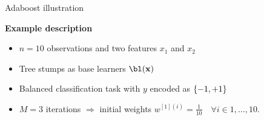 \documentclass[11pt,compress,t,notes=noshow, xcolor=table]{beamer}
\begin{document}
\begin{vbframe}{Adaboost illustration}
\begin{footnotesize}

\textbf{Example description}

\begin{itemize}
  \item $n = 10$ observations and two features $x_1$ and $x_2$ 
  \item Tree stumps as base learners $\bl(\xv)$
  \item Balanced classification task with $y$ encoded as $\{-1, +1\}$
  \item $M = 3$ iterations $\Rightarrow$ initial weights 
  $w^{[1](i)} = \frac{1}{10} \quad \forall i \in 1,\dots ,10$. 
\end{itemize}

\vfill


\end{footnotesize}
\end{vbframe}
\end{document}
